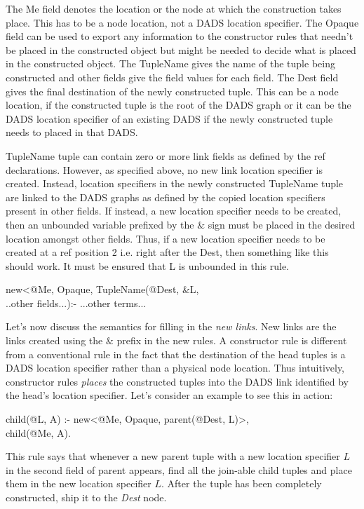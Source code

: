 The Me field denotes the location or the node at which the construction takes place. This has to be a node location, not a DADS location specifier. The Opaque field can be used to export any information to the constructor rules that needn't be placed in the constructed object but might be needed to decide what is placed in the constructed object. The TupleName gives the name of the tuple being constructed and other fields give the field values for each field. The Dest field gives the final destination of the newly constructed tuple. This can be a node location, if the constructed tuple is the root of the DADS graph or it can be the DADS location specifier of an existing DADS if the newly constructed tuple needs to placed in that DADS.

TupleName tuple can contain zero or more link fields as defined by the ref declarations. However, as specified above, no new link location specifier is created. Instead, location specifiers in the newly constructed TupleName tuple are linked to the DADS graphs as defined by the copied location specifiers present in other fields. If instead, a new location specifier needs to be created, then an unbounded variable prefixed by the $\&$ sign must be placed in the desired location amongst other fields. Thus, if a new location specifier needs to be created at a ref position 2 i.e. right after the Dest, then something like this should work. It must be ensured that L is unbounded in this rule.
\begin{code}
new<@Me, Opaque, TupleName(@Dest, \&L,\\
\> ..other fields...):- ...other terms...
\end{code}

Let's now discuss the semantics for filling in the {\em new links}. New links are the links created using the $\&$ prefix in the new rules. A constructor rule is different from a conventional rule in the fact that the destination of the head tuples is a DADS location specifier rather than a physical node location. Thus intuitively, constructor rules {\em places} the constructed tuples into the DADS link identified by the head's location specifier. Let's consider an example to see this in action:
\begin{code}
child(@L, A) :- new<@Me, Opaque, parent(@Dest, L)>,\\
\> child(@Me, A).
\end{code}

This rule says that whenever a new parent tuple with a new location specifier $L$ in the second field of parent appears, find all the join-able child tuples and place them in the new location specifier $L$. After the tuple has been completely constructed, ship it to the {\em Dest} node.

